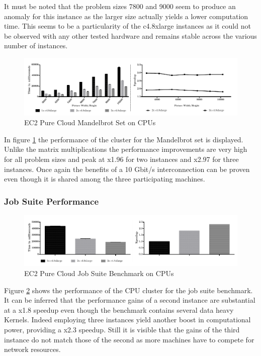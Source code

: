 It must be noted that the problem sizes 7800 and 9000 seem to produce an anomaly for this instance as the larger size actually yields a lower computation time. This seems to be a particularity of the c4.8xlarge instances as it could not be observed with any other tested hardware and remains stable across the various number of instances.

\begin{figure}[H]	
	\includegraphics[width=1.0\textwidth]{images/ec2_cpu_mandelbrot.pdf}
	\centering
	\caption{EC2 Pure Cloud Mandelbrot Set on CPUs}
	\label{img:ec2_cpu_mandelbrot}
\end{figure}

In figure \ref{img:ec2_cpu_mandelbrot} the performance of the cluster for the Mandelbrot set is displayed. Unlike the matrix multiplications the performance improvements are very high for all problem sizes and peak at x1.96 for two instances and x2.97 for three instances. Once again the benefits of a 10 Gbit/s interconnection can be proven even though it is shared among the three participating machines. 
\subsubsection*{Job Suite Performance}

\begin{figure}[H]	
	\includegraphics[width=1.0\textwidth]{images/ec2_cpu_full_benchmark.pdf}
	\centering
	\caption{EC2 Pure Cloud Job Suite Benchmark on CPUs}
	\label{img:ec2_cpu_full_benchmark}
\end{figure}

Figure \ref{img:ec2_cpu_full_benchmark} shows the performance of the CPU cluster for the job suite benchmark. It can be inferred that the performance gains of a second instance are substantial at a x1.8 speedup even though the benchmark contains several data heavy Kernels. Indeed employing three instances yield another boost in computational power, providing a x2.3 speedup. Still it is visible that the gains of the third instance do not match those of the second as more machines have to compete for network resources.

